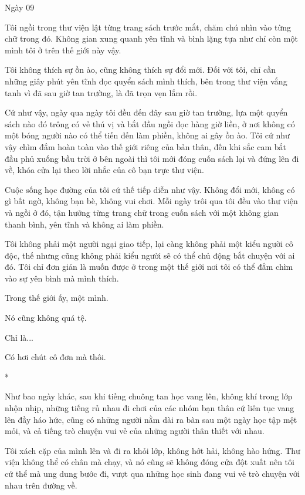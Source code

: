 {Ngày 09}
{

Tôi ngồi trong thư viện lật từng trang sách trước mắt, chăm chú nhìn vào
từng chữ trong đó. Không gian xung quanh yên tĩnh và bình lặng tựa như
chỉ còn một mình tôi ở trên thế giới này vậy.

Tôi không thích sự ồn ào, cũng không thích sự đổi mới. Đối với tôi, chỉ
cần những giây phút yên tĩnh đọc quyển sách mình thích, bên trong thư
viện vắng tanh vì đã sau giờ tan trường, là đã trọn vẹn lắm rồi.

Cứ như vậy, ngày qua ngày tôi đều đến đây sau giờ tan trường, lựa một
quyển sách nào đó trông có vẻ thú vị và bắt đầu ngồi đọc hàng giờ liền,
ở nơi không có một bóng người nào có thể tiến đến làm phiền, không ai
gây ồn ào. Tôi cứ như vậy chìm đắm hoàn toàn vào thế giới riêng của bản
thân, đến khi sắc cam bắt đầu phủ xuống bầu trời ở bên ngoài thì tôi mới
đóng cuốn sách lại và đứng lên đi về, khóa cửa lại theo lời nhắc của cô
bạn trực thư viện.

Cuộc sống học đường của tôi cứ thế tiếp diễn như vậy. Không đổi mới,
không có gì bất ngờ, không bạn bè, không vui chơi. Mỗi ngày trôi qua tôi
đều vào thư viện và ngồi ở đó, tận hưởng từng trang chữ trong cuốn sách
với một không gian thanh bình, yên tĩnh và không ai làm phiền.

Tôi không phải một người ngại giao tiếp, lại càng không phải một kiểu
người cô độc, thế nhưng cũng không phải kiểu người sẽ có thể chủ động
bắt chuyện với ai đó. Tôi chỉ đơn giản là muốn được ở trong một thế giới
nơi tôi có thể đắm chìm vào sự yên bình mà mình thích.

Trong thế giới ấy, một mình.

Nó cũng không quá tệ.

Chỉ là...

Có hơi chút cô đơn mà thôi.

*

Như bao ngày khác, sau khi tiếng chuông tan học vang lên, không khí
trong lớp nhộn nhịp, những tiếng rủ nhau đi chơi của các nhóm bạn thân
cứ liên tục vang lên đầy háo hức, cũng có những người nằm dài ra bàn sau
một ngày học tập mệt mỏi, và cả tiếng trò chuyện vui vẻ của những người
thân thiết với nhau.

Tôi xách cặp của mình lên và đi ra khỏi lớp, không hớt hải, không hào
hứng. Thư viện không thể có chân mà chạy, và nó cũng sẽ không đóng cửa
đột xuất nên tôi cứ thể mà ung dung bước đi, vượt qua những học sinh
đang vui vẻ trò chuyện với nhau trên đường về.

}
